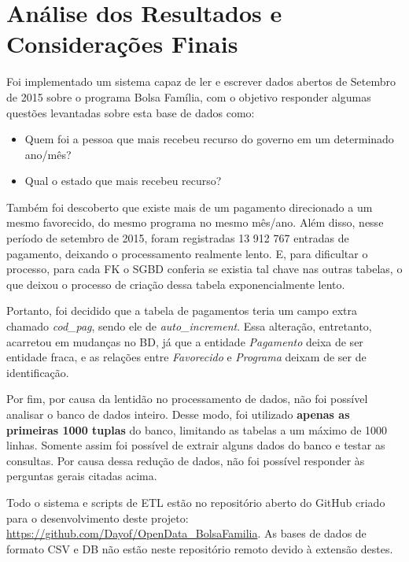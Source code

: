 \documentclass[12pt]{article}
\begin{document}
	\section{Análise dos Resultados e Considerações Finais}
	\label{sec:resultados}
	
	Foi implementado um sistema capaz de ler e escrever dados abertos de Setembro de 2015 sobre o programa Bolsa Família, com o objetivo responder algumas questões levantadas sobre esta base de dados como:
	
	\begin{itemize}
		\item Quem foi a pessoa que mais recebeu  recurso do governo em um determinado ano/mês?
		\item Qual o estado que mais recebeu recurso?
	\end{itemize}
	
	Também foi descoberto que existe mais de um pagamento direcionado a um mesmo favorecido, do mesmo programa no mesmo mês/ano. Além disso, nesse período de setembro de 2015, foram registradas 13 912 767 entradas de pagamento, deixando o processamento realmente lento. E, para dificultar o processo, para cada FK o SGBD conferia se existia tal chave nas outras tabelas, o que deixou o processo de criação dessa tabela exponencialmente lento.
	
	Portanto, foi decidido que a tabela de pagamentos teria um campo extra chamado \emph{cod{\_}pag}, sendo ele de \emph{auto{\_}increment}. Essa alteração, entretanto, acarretou em mudanças no BD, já que a entidade \emph{Pagamento} deixa de ser entidade fraca, e as relações entre \emph{Favorecido} e \emph{Programa} deixam de ser de identificação.
	
	Por fim, por causa da lentidão no processamento de dados, não foi possível analisar o banco de dados inteiro. Desse modo, foi utilizado \textbf{apenas as primeiras 1000 tuplas} do banco, limitando as tabelas a um máximo de 1000 linhas. Somente assim foi possível de extrair alguns dados do banco e testar as consultas. Por causa dessa redução de dados, não foi possível responder às perguntas gerais citadas acima.
	
	Todo o sistema e scripts de ETL estão no repositório aberto do GitHub criado para o desenvolvimento deste projeto: \url{https://github.com/Dayof/OpenData_BolsaFamilia}. As bases de dados de formato CSV e DB não estão neste repositório remoto devido à extensão destes.
	

 

	
\end{document}
